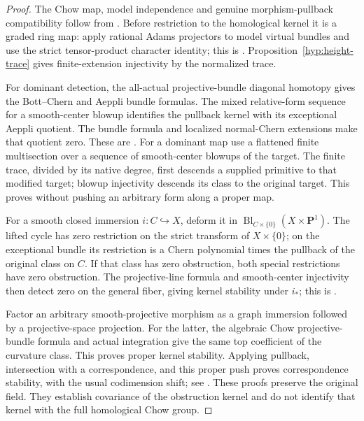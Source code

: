 \documentclass[11pt,a4paper]{article}
\theoremstyle{definition}
\theoremstyle{remark}
\numberwithin{equation}{section}
\begin{document}
\begin{proof}
The Chow map, model independence and genuine morphism-pullback compatibility follow from \cite[Theorem 1.1]{ChowGreenPairs}. Before restriction to the homological kernel it is a graded ring map: apply rational Adams projectors to model virtual bundles and use the strict tensor-product character identity; this is \cite[Proposition \texttt{r12p:ring}]{R12Parameters}. Proposition~\ref{hyp:height-trace} gives finite-extension injectivity by the normalized trace.

For dominant detection, the all-actual projective-bundle diagonal homotopy gives the Bott--Chern and Aeppli bundle formulas. The mixed relative-form sequence for a smooth-center blowup identifies the pullback kernel with its exceptional Aeppli quotient. The bundle formula and localized normal-Chern extensions make that quotient zero. These are \cite[Theorems \texttt{r16pb:formula} and \texttt{r16pb:blowup}]{PB16}. For a dominant map use a flattened finite multisection over a sequence of smooth-center blowups of the target. The finite trace, divided by its native degree, first descends a supplied primitive to that modified target; blowup injectivity descends its class to the original target. This proves \cite[Corollary \texttt{r16pb:dominant}]{PB16} without pushing an arbitrary form along a proper map.

For a smooth closed immersion $i:C\hookrightarrow X$, deform it in $\operatorname{Bl}_{C\times\{0\}}(X\times\mathbf P^1)$. The lifted cycle has zero restriction on the strict transform of $X\times\{0\}$; on the exceptional bundle its restriction is a Chern polynomial times the pullback of the original class on $C$. If that class has zero obstruction, both special restrictions have zero obstruction. The projective-line formula and smooth-center injectivity then detect zero on the general fiber, giving kernel stability under $i_*$; this is \cite[Theorem \texttt{r16gi:kernel}]{GI16}.

Factor an arbitrary smooth-projective morphism as a graph immersion followed by a projective-space projection. For the latter, the algebraic Chow projective-bundle formula and actual integration give the same top coefficient of the curvature class. This proves proper kernel stability. Applying pullback, intersection with a correspondence, and this proper push proves correspondence stability, with the usual codimension shift; see \cite[Theorem \texttt{r16cov:proper-push} and Proposition \texttt{r16cov:correspondences}]{CV16}. These proofs preserve the original field. They establish covariance of the obstruction kernel and do not identify that kernel with the full homological Chow group.
\end{proof}
\end{document}
